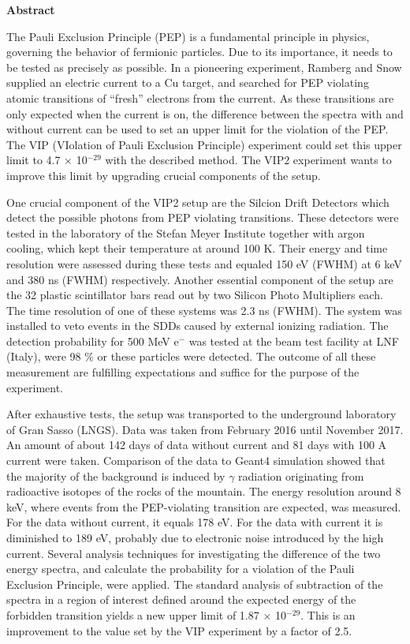 
\textbf{\LARGE{Abstract}}

The Pauli Exclusion Principle (PEP) is a fundamental principle in physics, governing the behavior of fermionic particles. Due to its importance, it needs to be tested as precisely as possible. In a pioneering experiment, Ramberg and Snow supplied an electric current to a Cu target, and searched for PEP violating atomic transitions of ``fresh'' electrons from the current. As these transitions are only expected when the current is on, the difference between the spectra with and without current can be used to set an upper limit for the violation of the PEP. The VIP (VIolation of Pauli Exclusion Principle) experiment could set this upper limit to 4.7 $\times$ 10$^{-29}$ with the described method. The VIP2 experiment wants to improve this limit by upgrading crucial components of the setup.

One crucial component of the VIP2 setup are the Silcion Drift Detectors which detect the possible photons from PEP violating transitions. These detectors were tested in the laboratory of the Stefan Meyer Institute together with argon cooling, which kept their temperature at around 100 K. Their energy and time resolution were assessed during these tests and equaled 150 eV (FWHM) at 6 keV and 380 ns (FWHM) respectively. Another essential component of the setup are the 32 plastic scintillator bars read out by two Silicon Photo Multipliers each. The time resolution of one of these systems was 2.3 ns (FWHM). The system was installed to veto events in the SDDs caused by external ionizing radiation. The detection probability for 500 MeV e$^{-}$ was tested at the beam test facility at LNF (Italy), were 98 \% or these particles were detected. The outcome of all these measurement are fulfilling expectations and suffice for the purpose of the experiment. 

After exhaustive tests, the setup was transported to the underground laboratory of Gran Sasso (LNGS). Data was taken from February 2016 until November 2017. An amount of about 142 days of data without current and 81 days with 100 A current were taken. Comparison of the data to Geant4 simulation showed that the majority of the background is induced by $\gamma$ radiation originating from radioactive isotopes of the rocks of the mountain. The energy resolution around 8 keV, where events from the PEP-violating transition are expected, was measured. For the data without current, it equals 178 eV. For the data with current it is diminished to 189 eV, probably due to electronic noise introduced by the high current. Several analysis techniques for investigating the difference of the two energy spectra, and calculate the probability for a violation of the Pauli Exclusion Principle, were applied. The standard analysis of subtraction of the spectra in a region of interest defined around the expected energy of the forbidden transition yields a new upper limit of 1.87 $\times$ 10$^{-29}$. This is an improvement to the value set by the VIP experiment by a factor of 2.5.
